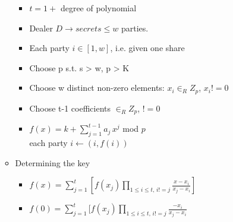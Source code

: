 \begin{itemize}
\begin{itemize}
\begin{itemize}
        \item $t = 1 +$ degree of polynomial
        \item Dealer $D \rightarrow secrets \le w$ parties.
        \item Each party $i \in [1,w]$, i.e. given one share
        \item Choose p s.t. s > w, p > K
        \item Choose w distinct non-zero elements: $x_i \in_R Z_p$, $x_i != 0$
        \item Choose t-1 coefficients $\in_R Z_p$, $!=0$
        \item $f(x) = k + \sum_{j=1}^{t-1}a_j\,x^j$ mod $p$
            \\each party $i \leftarrow (i, f(i))$
        \end{itemize}
    \item Determining the key
        \begin{itemize}
        \item $f(x) = \sum_{j=1}^t[f(x_j) \prod_{1\le i \le t,\,i != j} \frac{x-x_i}{x_j-x_i}]$
        \item $f(0) = \sum_{j=1}^t[f(x_j) \prod_{1\le i \le t,\,i != j} \frac{-x_i}{x_j-x_i}$
        \end{itemize}
    \end{itemize}
\end{itemize}